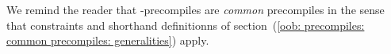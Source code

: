 We remind the reader that \blsMod{}-precompiles are \emph{common} precompiles in the sense that
constraints and shorthand definitionns of
section~(\ref{oob: precompiles: common precompiles: generalities})
apply.
